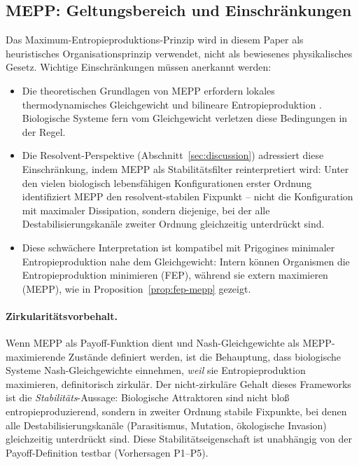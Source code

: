 \documentclass[12pt,a4paper]{article}
\theoremstyle{remark}
\begin{document}
\subsection{MEPP: Geltungsbereich und Einschr\"ankungen}

Das Maximum-Entropieproduktions-Prinzip wird in diesem Paper als heuristisches Organisationsprinzip verwendet, nicht als bewiesenes physikalisches Gesetz. Wichtige Einschr\"ankungen m\"ussen anerkannt werden:
\begin{itemize}
\item Die theoretischen Grundlagen von MEPP erfordern lokales thermodynamisches Gleichgewicht und bilineare Entropieproduktion \citep{Martyushev2010}. Biologische Systeme fern vom Gleichgewicht verletzen diese Bedingungen in der Regel.
\item Die Resolvent-Perspektive (Abschnitt~\ref{sec:discussion}) adressiert diese Einschr\"ankung, indem MEPP als Stabilit\"atsfilter reinterpretiert wird: Unter den vielen biologisch lebensf\"ahigen Konfigurationen erster Ordnung identifiziert MEPP den resolvent-stabilen Fixpunkt -- nicht die Konfiguration mit maximaler Dissipation, sondern diejenige, bei der alle Destabilisierungskan\"ale zweiter Ordnung gleichzeitig unterdr\"uckt sind.
\item Diese schw\"achere Interpretation ist kompatibel mit Prigogines minimaler Entropieproduktion nahe dem Gleichgewicht: Intern k\"onnen Organismen die Entropieproduktion minimieren (FEP), w\"ahrend sie extern maximieren (MEPP), wie in Proposition~\ref{prop:fep-mepp} gezeigt.
\end{itemize}

\paragraph{Zirkularit\"atsvorbehalt.} Wenn MEPP als Payoff-Funktion dient und Nash-Gleichgewichte als MEPP-maximierende Zust\"ande definiert werden, ist die Behauptung, dass biologische Systeme Nash-Gleichgewichte einnehmen, \emph{weil} sie Entropieproduktion maximieren, definitorisch zirkul\"ar. Der nicht-zirkul\"are Gehalt dieses Frameworks ist die \emph{Stabilit\"ats}-Aussage: Biologische Attraktoren sind nicht blo\ss{} entropieproduzierend, sondern in zweiter Ordnung stabile Fixpunkte, bei denen alle Destabilisierungskan\"ale (Parasitismus, Mutation, \"okologische Invasion) gleichzeitig unterdr\"uckt sind. Diese Stabilit\"atseigenschaft ist unabh\"angig von der Payoff-Definition testbar (Vorhersagen P1--P5).
\end{document}
